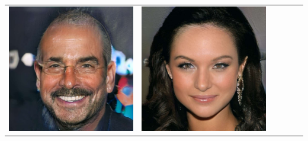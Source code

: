 \documentclass[a0,landscape]{a0poster}
\begin{document}
\begin{multicols}{3}
\begin{center}
\begin{tabular}{cc|cc|cc}
\includegraphics[width=\pganw]{../figures/pgan/56_base_iso_base.jpg} &
\includegraphics[width=\pganw]{../figures/pgan/57_base_iso_base.jpg} &

\end{tabular}
\end{center}
\end{multicols}
\end{document}
